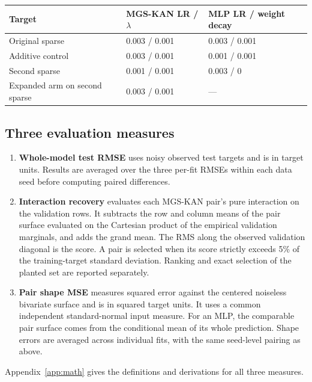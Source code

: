 \documentclass[11pt]{article}
\numberwithin{equation}{section}
\begin{document}
\begin{center}
\small
\begin{tabularx}{\linewidth}{@{} Y Z Z @{}}
\toprule
\textbf{Target} & \textbf{MGS-KAN LR / \ensuremath{\lambda}} & \textbf{MLP LR / weight decay} \\
\midrule
Original sparse & 0.003 / 0.001 & 0.003 / 0.001 \\
Additive control & 0.003 / 0.001 & 0.001 / 0.001 \\
Second sparse & 0.001 / 0.001 & 0.003 / 0 \\
Expanded arm on second sparse & 0.003 / 0.001 & --- \\
\bottomrule
\end{tabularx}
\end{center}

\subsection{Three evaluation measures}

\begin{enumerate}

\item \textbf{Whole-model test RMSE} uses noisy observed test targets and is in target units.
Results are averaged over the three per-fit RMSEs within each data seed before computing
paired differences.

\item \textbf{Interaction recovery} evaluates each MGS-KAN pair's pure interaction on the validation
rows. It subtracts the row and column means of the pair surface evaluated on the Cartesian
product of the empirical validation marginals, and adds the grand mean. The RMS along the
observed validation diagonal is the score. A pair is selected when its score strictly exceeds
5\% of the training-target standard deviation. Ranking and exact selection of the planted set
are reported separately.

\item \textbf{Pair shape MSE} measures squared error against the centered noiseless bivariate
surface and is in squared target units. It uses a common independent standard-normal input
measure. For an MLP, the comparable pair surface comes from the conditional mean of its whole
prediction. Shape errors are averaged across individual fits, with the same seed-level pairing
as above.

\end{enumerate}

Appendix~\ref{app:math} gives the definitions and derivations for all three measures.
\end{document}

